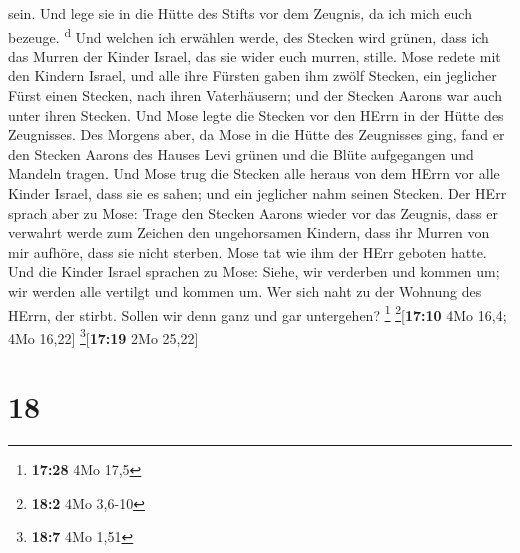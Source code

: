 sein.  Und lege sie in die Hütte des Stifts vor dem
Zeugnis, da ich mich euch bezeuge. \textsuperscript{d} 
Und welchen ich erwählen werde, des Stecken wird grünen, dass ich das
Murren der Kinder Israel, das sie wider euch murren, stille.
 Mose redete mit den Kindern Israel, und alle ihre
Fürsten gaben ihm zwölf Stecken, ein jeglicher Fürst einen Stecken, nach
ihren Vaterhäusern; und der Stecken Aarons war auch unter ihren Stecken.
 Und Mose legte die Stecken vor den HErrn in der Hütte
des Zeugnisses.  Des Morgens aber, da Mose in die Hütte
des Zeugnisses ging, fand er den Stecken Aarons des Hauses Levi grünen
und die Blüte aufgegangen und Mandeln tragen.  Und Mose
trug die Stecken alle heraus von dem HErrn vor alle Kinder Israel, dass
sie es sahen; und ein jeglicher nahm seinen Stecken.  Der
HErr sprach aber zu Mose: Trage den Stecken Aarons wieder vor das
Zeugnis, dass er verwahrt werde zum Zeichen den ungehorsamen Kindern,
dass ihr Murren von mir aufhöre, dass sie nicht sterben. 
Mose tat wie ihm der HErr geboten hatte.  Und die Kinder
Israel sprachen zu Mose: Siehe, wir verderben und kommen um; wir werden
alle vertilgt und kommen um.  Wer sich naht zu der
Wohnung des HErrn, der stirbt. Sollen wir denn ganz und gar untergehen?
\footnote{\textbf{17:28} 4Mo 17,5} \footnote{\textbf{18:2} 4Mo 3,6-10}{[}\textbf{17:10}
4Mo 16,4; 4Mo 16,22{]} \footnote{\textbf{18:7} 4Mo 1,51}{[}\textbf{17:19}
2Mo 25,22{]}

\hypertarget{section-17}{%
\section{18}\label{section-17}}

